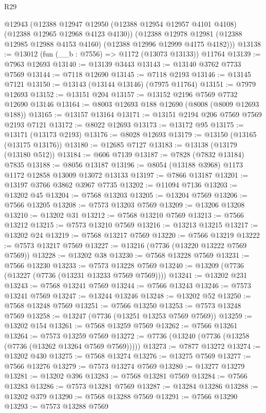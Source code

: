 \begin{lexlean}{R29}
\begin{coremodule}
      @12943
      (@12388 @12947 @12950 (@12388 @12954 @12957 @4101 @4108) (@12388 @12965 @12968 @4123 @4130))
      (@12388 @12978 @12981 (@12388 @12985 @12988 @4153 @4160) (@12388 @12996 @12999 @4175 @4182)))
@13138 := @13012 (fun (__b : @7556) => @1172 (@13073 @13133)) @11764
@13139 := @7963 @12693
@13140 := @13139 @3443
@13143 := @13140 @3762 @7733 @7569
@13144 := @7118 @12690
@13145 := @7118 @2193
@13146 := @13145 @7121
@13150 := @13143 (@13144 @13146) (@7975 @11764)
@13151 := @7979 @12693
@13152 := @13151 @204
@13157 := @13152 @2196 @7569 @7732 @12690 @13146
@13164 := @8003 @12693 @188 @12690 (@8008 (@8009 @12693 @188))
@13165 := @13157 @13164
@13171 := @13151 @2194 @206 @7569 @7569 @2193 @7121
@13172 := @8022 @12693
@13173 := @13172 @95
@13175 := @13171 (@13173 @2193)
@13176 := @8028 @12693
@13179 := @13150 (@13165 (@13175 @13176))
@13180 := @12685 @7127
@13183 := @13138 (@13179 (@13180 @512))
@13184 := @606 @7139
@13187 := @7828 (@7832 @13184) @7835
@13188 := @8056 @13187
@13196 := @8054 (@13188 @3968) @1173 @1172 @12858 @13009 @13072 @13133
@13197 := @7866 @13187
@13201 := @13197 @3766 @3862 @3967 @7735
@13202 := @11094 @7136
@13203 := @13202 @45
@13204 := @7568 @13203
@13205 := @13204 @7569
@13206 := @7566 @13205
@13208 := @7573 @13203 @7569
@13209 := @13206 @13208
@13210 := @13202 @31
@13212 := @7568 @13210 @7569
@13213 := @7566 @13212
@13215 := @7573 @13210 @7569
@13216 := @13213 @13215
@13217 := @13202 @24
@13219 := @7568 @13217 @7569
@13220 := @7566 @13219
@13222 := @7573 @13217 @7569
@13227 := @13216 (@7736 (@13220 @13222 @7569 @7569))
@13228 := @13202 @38
@13230 := @7568 @13228 @7569
@13231 := @7566 @13230
@13233 := @7573 @13228 @7569
@13240 := @13209 (@7736 (@13227 (@7736 (@13231 @13233 @7569 @7569))))
@13241 := @13202 @231
@13243 := @7568 @13241 @7569
@13244 := @7566 @13243
@13246 := @7573 @13241 @7569
@13247 := @13244 @13246
@13248 := @13202 @52
@13250 := @7568 @13248 @7569
@13251 := @7566 @13250
@13253 := @7573 @13248 @7569
@13258 := @13247 (@7736 (@13251 @13253 @7569 @7569))
@13259 := @13202 @154
@13261 := @7568 @13259 @7569
@13262 := @7566 @13261
@13264 := @7573 @13259 @7569
@13272 := @7736 (@13240 (@7736 (@13258 (@7736 (@13262 @13264 @7569 @7569)))))
@13273 := @7877 @13272
@13274 := @13202 @430
@13275 := @7568 @13274
@13276 := @13275 @7569
@13277 := @7566 @13276
@13279 := @7573 @13274 @7569
@13280 := @13277 @13279
@13281 := @13202 @396
@13283 := @7568 @13281 @7569
@13284 := @7566 @13283
@13286 := @7573 @13281 @7569
@13287 := @13284 @13286
@13288 := @13202 @379
@13290 := @7568 @13288 @7569
@13291 := @7566 @13290
@13293 := @7573 @13288 @7569

\end{coremodule}
\end{lexlean}
